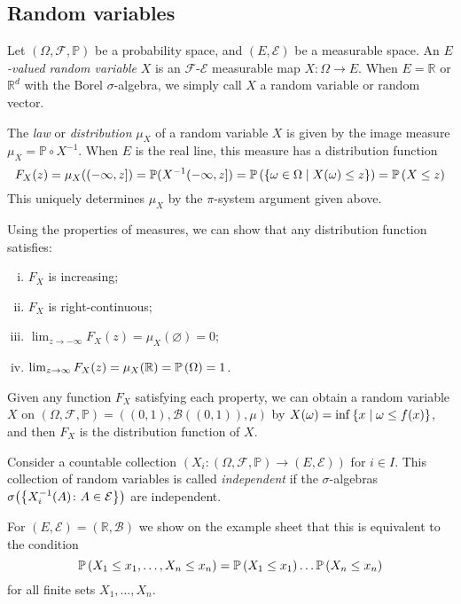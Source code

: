 \subsection{Random variables}
\begin{definition}
	Let \( (\Omega, \mathcal F, \mathbb P) \) be a probability space, and \( (E, \mathcal E) \) be a measurable space.
	An \emph{\( E \)-valued random variable} \( X \) is an \( \mathcal F \)-\( \mathcal E \) measurable map \( X \colon \Omega \to E \).
	When \( E = \mathbb R \) or \( \mathbb R^d \) with the Borel \( \sigma \)-algebra, we simply call \( X \) a random variable or random vector.

	The \emph{law} or \emph{distribution} \( \mu_X \) of a random variable \( X \) is given by the image measure \( \mu_X = \mathbb P \circ X^{-1} \).
	When \( E \) is the real line, this measure has a distribution function
	\[ F_X(z) = \mu_X((-\infty, z]) = \mathbb P(X^{-1}(-\infty,z]) = \mathbb{P}\left({\qty{\omega \in \Omega \mid X(\omega) \leq z}}\right) = \mathbb{P}\left({X \leq z}\right) \]
	This uniquely determines \( \mu_X \) by the \( \pi \)-system argument given above.
\end{definition}
Using the properties of measures, we can show that any distribution function satisfies:
\begin{enumerate}[(i)]
	\item \( F_X \) is increasing;
	\item \( F_X \) is right-continuous;
	\item \( \lim_{z \to -\infty} F_X(z) = \mu_X(\varnothing) = 0 \);
	\item \( \lim_{z \to \infty} F_X(z) = \mu_X(\mathbb R) = \mathbb{P}\left({\Omega}\right) = 1 \).
\end{enumerate}
Given any function \( F_X \) satisfying each property, we can obtain a random variable \( X \) on \( (\Omega, \mathcal F, \mathbb P) = ((0,1), \mathcal B((0,1)), \mu) \) by \( X(\omega) = \inf\qty{x \mid \omega \leq f(x)} \), and then \( F_X \) is the distribution function of \( X \).
\begin{definition}
	Consider a countable collection \( (X_i \colon (\Omega, \mathcal F, \mathbb P) \to (E, \mathcal E)) \) for \( i \in I \).
	This collection of random variables is called \emph{independent} if the \( \sigma \)-algebras \( \sigma\qty(\qty{X_i^{-1}(A) \colon A \in \mathcal E}) \) are independent.
\end{definition}
For \( (E, \mathcal E) = (\mathbb R, \mathcal B) \) we show on the example sheet that this is equivalent to the condition
\[ \mathbb{P}\left({X_1 \leq x_1, \dots, X_n \leq x_n}\right) = \mathbb{P}\left({X_1 \leq x_1}\right) \dots \mathbb{P}\left({X_n \leq x_n}\right) \]
for all finite sets \( X_1, \dots, X_n \).

